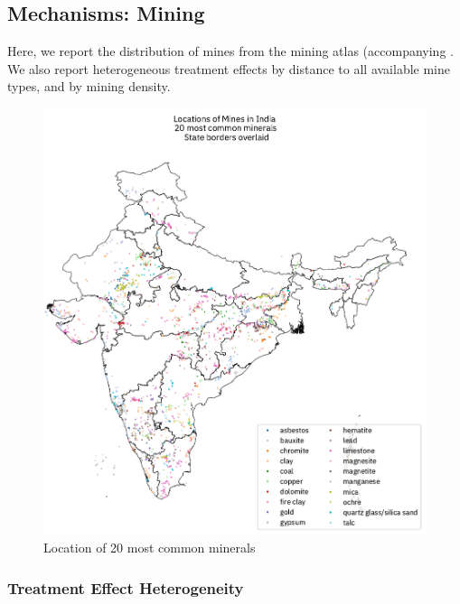 \documentclass[12pt,reqno]{article}
\begin{document}
\begin{refsection}
\begin{figure}[htbp!]
\begin{center}
\begin{minipage}{1 \linewidth}
\end{minipage}
\end{center}
\end{figure}


\pagebreak

\subsection{Mechanisms: Mining}

Here, we report the distribution of mines from the mining atlas (accompanying \textcite{asher2019rent}. We also report 
heterogeneous treatment effects by distance to all available mine types, and by mining density.

\begin{figure}[htbp!]
  \centering
  \includegraphics[width=5in,angle=0]{Output/mine_map.png}
  \caption{Location of 20 most common minerals}
  \label{fig:mine_map}
\end{figure}

\pagebreak

\subsubsection{Treatment Effect Heterogeneity}


\end{refsection}
\end{document}
